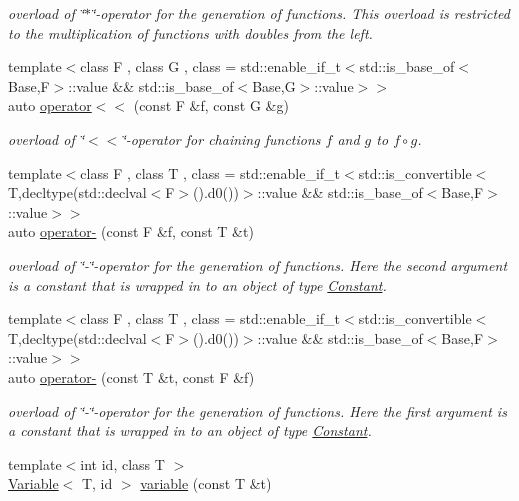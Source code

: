 \begin{DoxyCompactItemize}
\begin{DoxyCompactList}\small\item\em overload of \char`\"{}$\ast$\char`\"{}-\/operator for the generation of functions. This overload is restricted to the multiplication of functions with doubles from the left. \end{DoxyCompactList}\item 
{\footnotesize template$<$class F , class G , class  = std\-::enable\-\_\-if\-\_\-t$<$std\-::is\-\_\-base\-\_\-of$<$\-Base,\-F$>$\-::value \&\&                                     std\-::is\-\_\-base\-\_\-of$<$\-Base,\-G$>$\-::value$>$$>$ }\\auto \hyperlink{namespaceRFFGen_a2c40e5d41ad211f6d861f2862a02e670}{operator$<$$<$} (const F \&f, const G \&g)
\begin{DoxyCompactList}\small\item\em overload of \char`\"{}$<$$<$\char`\"{}-\/operator for chaining functions $f$ and $g$ to $ f \circ g $. \end{DoxyCompactList}\item 
{\footnotesize template$<$class F , class T , class  = std\-::enable\-\_\-if\-\_\-t$<$std\-::is\-\_\-convertible$<$\-T,decltype(std\-::declval$<$\-F$>$().\-d0())$>$\-::value \&\&                                     std\-::is\-\_\-base\-\_\-of$<$\-Base,\-F$>$\-::value$>$$>$ }\\auto \hyperlink{namespaceRFFGen_a933ac482bf44b977bbe2ce057362b55a}{operator-\/} (const F \&f, const T \&t)
\begin{DoxyCompactList}\small\item\em overload of \char`\"{}-\/\char`\"{}-\/operator for the generation of functions. Here the second argument is a constant that is wrapped in to an object of type \hyperlink{structRFFGen_1_1Constant}{Constant}. \end{DoxyCompactList}\item 
{\footnotesize template$<$class F , class T , class  = std\-::enable\-\_\-if\-\_\-t$<$std\-::is\-\_\-convertible$<$\-T,decltype(std\-::declval$<$\-F$>$().\-d0())$>$\-::value \&\&                                     std\-::is\-\_\-base\-\_\-of$<$\-Base,\-F$>$\-::value$>$$>$ }\\auto \hyperlink{namespaceRFFGen_a7b334216a1a47d21c0ecb857ad279580}{operator-\/} (const T \&t, const F \&f)
\begin{DoxyCompactList}\small\item\em overload of \char`\"{}-\/\char`\"{}-\/operator for the generation of functions. Here the first argument is a constant that is wrapped in to an object of type \hyperlink{structRFFGen_1_1Constant}{Constant}. \end{DoxyCompactList}\item 
\hypertarget{namespaceRFFGen_a9ff332846164ad83741fdb7b7f62a0d6}{{\footnotesize template$<$int id, class T $>$ }\\\hyperlink{structRFFGen_1_1Variable}{Variable}$<$ T, id $>$ \hyperlink{namespaceRFFGen_a9ff332846164ad83741fdb7b7f62a0d6}{variable} (const T \&t)}\label{namespaceRFFGen_a9ff332846164ad83741fdb7b7f62a0d6}


\end{DoxyCompactItemize}
